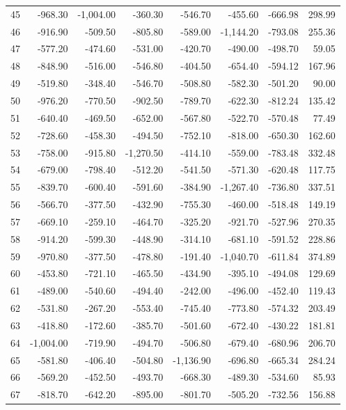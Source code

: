 \begin{longtable}{rrrrrrrr}
45 & -968.30 & -1,004.00 & -360.30 & -546.70 & -455.60 & -666.98 & 298.99  \\
46 & -916.90 & -509.50 & -805.80 & -589.00 & -1,144.20 & -793.08 & 255.36  \\
47 & -577.20 & -474.60 & -531.00 & -420.70 & -490.00 & -498.70 & 59.05  \\
48 & -848.90 & -516.00 & -546.80 & -404.50 & -654.40 & -594.12 & 167.96  \\
49 & -519.80 & -348.40 & -546.70 & -508.80 & -582.30 & -501.20 & 90.00  \\
50 & -976.20 & -770.50 & -902.50 & -789.70 & -622.30 & -812.24 & 135.42  \\
51 & -640.40 & -469.50 & -652.00 & -567.80 & -522.70 & -570.48 & 77.49  \\
52 & -728.60 & -458.30 & -494.50 & -752.10 & -818.00 & -650.30 & 162.60  \\
53 & -758.00 & -915.80 & -1,270.50 & -414.10 & -559.00 & -783.48 & 332.48  \\
54 & -679.00 & -798.40 & -512.20 & -541.50 & -571.30 & -620.48 & 117.75  \\
55 & -839.70 & -600.40 & -591.60 & -384.90 & -1,267.40 & -736.80 & 337.51  \\
56 & -566.70 & -377.50 & -432.90 & -755.30 & -460.00 & -518.48 & 149.19  \\
57 & -669.10 & -259.10 & -464.70 & -325.20 & -921.70 & -527.96 & 270.35  \\
58 & -914.20 & -599.30 & -448.90 & -314.10 & -681.10 & -591.52 & 228.86  \\
59 & -970.80 & -377.50 & -478.80 & -191.40 & -1,040.70 & -611.84 & 374.89  \\
60 & -453.80 & -721.10 & -465.50 & -434.90 & -395.10 & -494.08 & 129.69  \\
61 & -489.00 & -540.60 & -494.40 & -242.00 & -496.00 & -452.40 & 119.43  \\
62 & -531.80 & -267.20 & -553.40 & -745.40 & -773.80 & -574.32 & 203.49  \\
63 & -418.80 & -172.60 & -385.70 & -501.60 & -672.40 & -430.22 & 181.81  \\
64 & -1,004.00 & -719.90 & -494.70 & -506.80 & -679.40 & -680.96 & 206.70  \\
65 & -581.80 & -406.40 & -504.80 & -1,136.90 & -696.80 & -665.34 & 284.24  \\
66 & -569.20 & -452.50 & -493.70 & -668.30 & -489.30 & -534.60 & 85.93  \\
67 & -818.70 & -642.20 & -895.00 & -801.70 & -505.20 & -732.56 & 156.88  \\

\end{longtable}
